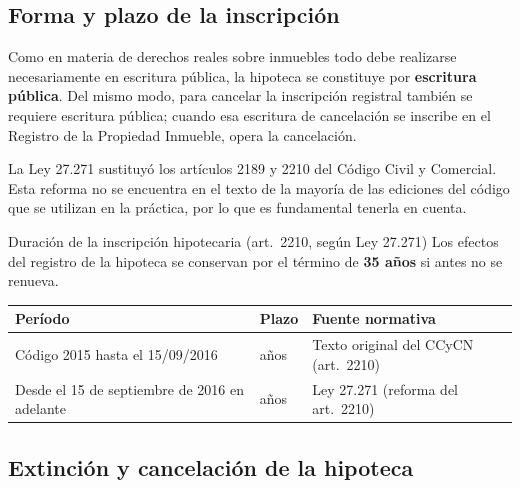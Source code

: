 \documentclass[12pt,oneside]{book}
\begin{document}
\subsection{Forma y plazo de la inscripción}

Como en materia de derechos reales sobre inmuebles todo debe realizarse necesariamente en escritura pública, la hipoteca se constituye por \textbf{escritura pública}. Del mismo modo, para cancelar la inscripción registral también se requiere escritura pública; cuando esa escritura de cancelación se inscribe en el Registro de la Propiedad Inmueble, opera la cancelación.

\begin{importante}
La Ley 27.271 sustituyó los artículos 2189 y 2210 del Código Civil y Comercial. Esta reforma no se encuentra en el texto de la mayoría de las ediciones del código que se utilizan en la práctica, por lo que es fundamental tenerla en cuenta.
\end{importante}

\begin{regla}{Duración de la inscripción hipotecaria (art.~2210, según Ley 27.271)}
Los efectos del registro de la hipoteca se conservan por el término de \textbf{35 años} si antes no se renueva.
\end{regla}

\begin{table}[H]
\centering
\begin{tabularx}{\textwidth}{@{}>{\raggedright\arraybackslash}p{}>{\raggedright\arraybackslash}p{}>{\raggedright\arraybackslash}X@{}}
\toprule
\textbf{Período} & \textbf{Plazo} & \textbf{Fuente normativa} \\
\midrule
Código 2015 hasta el 15/09/2016 & 20 años & Texto original del CCyCN (art.~2210) \\
Desde el 15 de septiembre de 2016 en adelante & 35 años & Ley 27.271 (reforma del art.~2210) \\
\bottomrule
\end{tabularx}
\end{table}

\subsection{Extinción y cancelación de la hipoteca}
\end{document}

